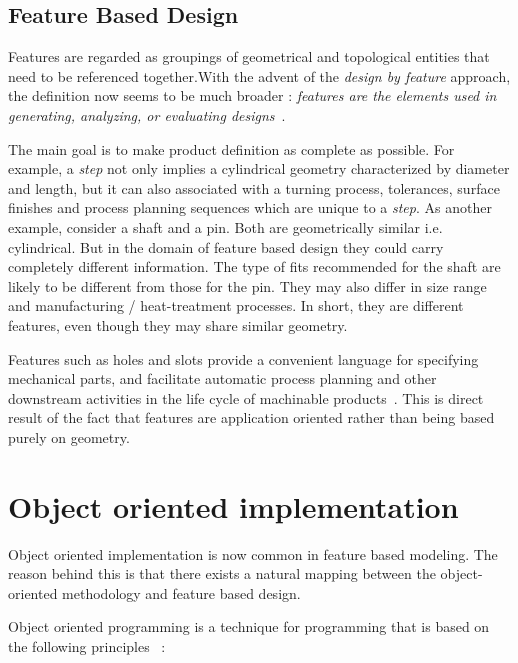     \subsection{Feature Based Design}

    Features are regarded as groupings of geometrical and topological
    entities that need to be referenced together.With the advent of the {\em
    design by feature} approach, the definition now seems to be much broader :
    {\it features are the elements used in generating, analyzing, or
    evaluating designs}~\cite{Shah91}.

    The main goal is to make product definition as complete as possible. For
    example,  a {\em step} not only implies a cylindrical geometry
    characterized by diameter and length, but it can also associated
    with a turning process, tolerances, surface finishes and process planning
    sequences which
    are unique to a {\em step}. As another example, consider a shaft and a pin.
    Both are geometrically similar i.e. cylindrical. But in the domain of
    feature based design they could carry completely different information. The
	type of fits recommended for the shaft are likely to be different from
	those for the pin. They may also differ in size range and manufacturing /
	heat-treatment processes. In short, they are different features, even though
	they may share similar geometry.

    Features such as holes and slots provide a convenient language for
    specifying mechanical parts, and facilitate automatic process
    planning and other downstream activities in the life cycle of machinable
    products~\cite{Requi89}. This is direct result of the fact that
    features are application oriented rather than being based purely on 
	geometry.



    \section{Object oriented implementation}

    Object oriented implementation is now common in feature based modeling.
    The reason behind this is that there exists a natural mapping between the
    object-oriented methodology and feature based design.

    Object oriented programming is a technique for programming that is based 
	on the following principles~\cite{Strou} :

